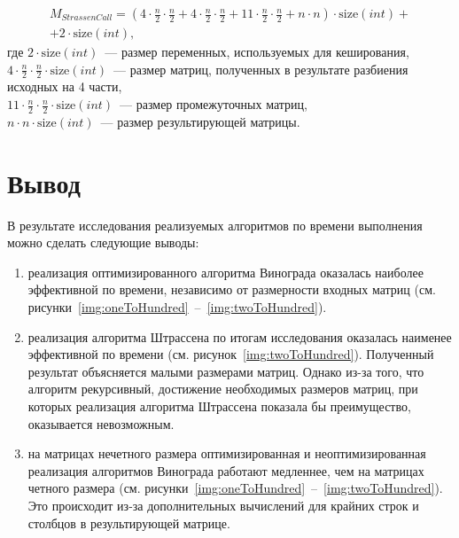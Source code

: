 \begin{equation}
	\begin{gathered}
		M_{StrassenCall} = (4 \cdot \frac{n}{2} \cdot \frac{n}{2} + 4 \cdot \frac{n}{2} \cdot \frac{n}{2} + 11 \cdot \frac{n}{2} \cdot \frac{n}{2} + n \cdot n) \cdot \text{size}(int) + \\
		+ 2 \cdot \text{size}(int),
	\end{gathered}
\end{equation}
где $2 \cdot \text{size}(int)$~--- размер переменных, используемых для кеширования,
\\ $4 \cdot \frac{n}{2} \cdot \frac{n}{2} \cdot \text{size}(int)$~--- размер матриц, полученных в результате разбиения исходных на 4 части,
\\ $11 \cdot \frac{n}{2} \cdot \frac{n}{2} \cdot \text{size}(int)$~--- размер промежуточных матриц,
\\ $n \cdot n \cdot \text{size}(int)$~--- размер результирующей матрицы.

\section{Вывод}

В результате исследования реализуемых алгоритмов по времени выполнения можно сделать следующие выводы:
\begin{enumerate}
	\item реализация оптимизированного алгоритма Винограда оказалась наиболее эффективной по времени, независимо от размерности входных матриц (см. рисунки~\ref{img:oneToHundred}~--~\ref{img:twoToHundred}).
	
	\item реализация алгоритма Штрассена по итогам исследования оказалась наименее эффективной по времени (см. рисунок~\ref{img:twoToHundred}).
	Полученный результат объясняется малыми размерами матриц. Однако из-за того, что алгоритм рекурсивный, достижение необходимых размеров матриц, при которых реализация алгоритма Штрассена показала бы преимущество, оказывается невозможным.
	
	\item на матрицах нечетного размера оптимизированная и неоптимизированная реализация алгоритмов Винограда работают медленнее, чем на матрицах четного размера (см. рисунки~\ref{img:oneToHundred}~--~\ref{img:twoToHundred}). Это происходит из-за дополнительных вычислений для крайних строк и столбцов в результирующей матрице.
\end{enumerate}

